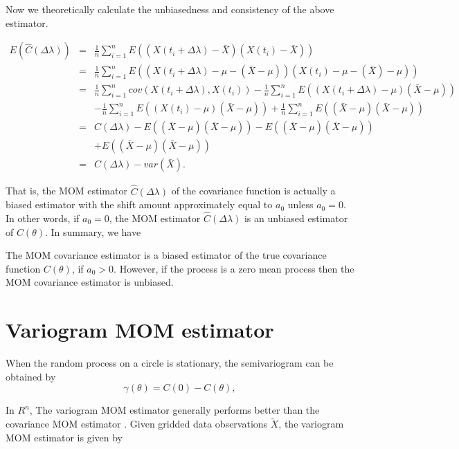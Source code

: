 Now we theoretically calculate the unbiasedness and consistency of the above estimator.

\begin{eqnarray*}
	E(\hat{C}(\Delta \lambda)) &=& \frac{1}{n}\sum_{i = 1}^n E((X(t_i + \Delta \lambda) - \bar{X})(X(t_i) - \bar{X})) \\
	&=& \frac{1}{n}\sum_{i = 1}^n E((X(t_i + \Delta \lambda) - \mu - (\bar{X} - \mu))(X(t_i) -\mu - (\bar{X}) - \mu)) \\
	&=& \frac{1}{n}\sum_{i=1}^n cov(X(t_i+\Delta \lambda), X(t_i)) - \frac{1}{n}\sum_{i = 1}^n E((X(t_i + \Delta \lambda) - \mu)(\bar{X} - \mu)) \\
	& & -\frac{1}{n}\sum_{i = 1}^n E((X(t_i) - \mu)(\bar{X} - \mu)) + \frac{1}{n}\sum_{i = 1}^n E((\bar{X} - \mu)(\bar{X} - \mu)) \\
	&=& C(\Delta \lambda) -E((\bar{X} - \mu)(\bar{X} - \mu)) - E((\bar{X} - \mu)(\bar{X} - \mu)) \\
	& & + E((\bar{X} - \mu)(\bar{X} - \mu)) \\
	&=& C(\Delta \lambda) - var(\bar{X}).
\end{eqnarray*}

That is, the MOM estimator $\hat{C}(\Delta \lambda)$ of the covariance function is actually a biased estimator with the shift amount approximately equal to $a_0$ unless $a_0 = 0$. In other words, if $a_0 = 0$, the MOM estimator $\hat{C}(\Delta \lambda)$ is an unbiased estimator of $C(\theta)$. In summary, we have \\

\begin{prop} \label{prop3.2}
The MOM covariance estimator is a biased estimator of the true covariance function $C(\theta)$, if $a_0 > 0$. However, if the process is a zero mean process then the MOM covariance estimator is unbiased.\\
\end{prop}



\section{Variogram MOM estimator}
When the random process on a circle is stationary, the semivariogram can be obtained by
\[
\gamma(\theta) = C(0) - C(\theta),
\]

In $R^n$, The variogram MOM estimator generally performs better than the covariance MOM estimator \cite{Cressie1993}. Given gridded data observations $\utilde{X}$, the variogram MOM estimator is given by

